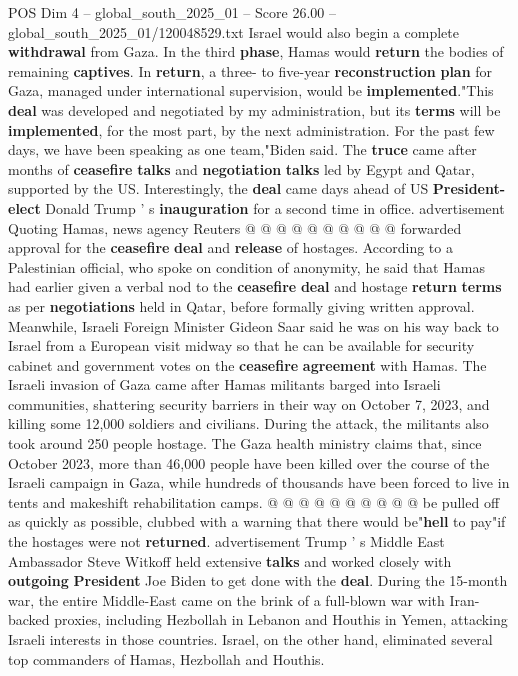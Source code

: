 \begin{textsample}{POS Dim 4 – global\_south\_2025\_01 – Score 26.00 – global\_south\_2025\_01/120048529.txt}
Israel would also begin a complete \textbf{withdrawal} from Gaza.
In the third \textbf{phase}, Hamas would \textbf{return} the bodies of remaining \textbf{captives}.
In \textbf{return}, a three- to five-year \textbf{reconstruction} \textbf{plan} for Gaza, managed under international supervision, would be \textbf{implemented}."This \textbf{deal} was developed and negotiated by my administration, but its \textbf{terms} will be \textbf{implemented}, for the most part, by the next administration.
For the past few days, we have been speaking as one team,"Biden said.
The \textbf{truce} came after months of \textbf{ceasefire} \textbf{talks} and \textbf{negotiation} \textbf{talks} led by Egypt and Qatar, supported by the US.
Interestingly, the \textbf{deal} came days ahead of US \textbf{President-elect} Donald Trump ' s \textbf{inauguration} for a second time in office. advertisement Quoting Hamas, news agency Reuters @ @ @ @ @ @ @ @ @ @ forwarded approval for the \textbf{ceasefire} \textbf{deal} and \textbf{release} of hostages.
According to a Palestinian official, who spoke on condition of anonymity, he said that Hamas had earlier given a verbal nod to the \textbf{ceasefire} \textbf{deal} and hostage \textbf{return} \textbf{terms} as per \textbf{negotiations} held in Qatar, before formally giving written approval.
Meanwhile, Israeli Foreign Minister Gideon Saar said he was on his way back to Israel from a European visit midway so that he can be available for security cabinet and government votes on the \textbf{ceasefire} \textbf{agreement} with Hamas.
The Israeli invasion of Gaza came after Hamas militants barged into Israeli communities, shattering security barriers in their way on October 7, 2023, and killing some 12,000 soldiers and civilians.
During the attack, the militants also took around 250 people hostage.
The Gaza health ministry claims that, since October 2023, more than 46,000 people have been killed over the course of the Israeli campaign in Gaza, while hundreds of thousands have been forced to live in tents and makeshift rehabilitation camps. @ @ @ @ @ @ @ @ @ @ be pulled off as quickly as possible, clubbed with a warning that there would be"\textbf{hell} to pay"if the hostages were not \textbf{returned}. advertisement Trump ' s Middle East Ambassador Steve Witkoff held extensive \textbf{talks} and worked closely with \textbf{outgoing} \textbf{President} Joe Biden to get done with the \textbf{deal}.
During the 15-month war, the entire Middle-East came on the brink of a full-blown war with Iran-backed proxies, including Hezbollah in Lebanon and Houthis in Yemen, attacking Israeli interests in those countries.
Israel, on the other hand, eliminated several top commanders of Hamas, Hezbollah and Houthis.

\end{textsample}

